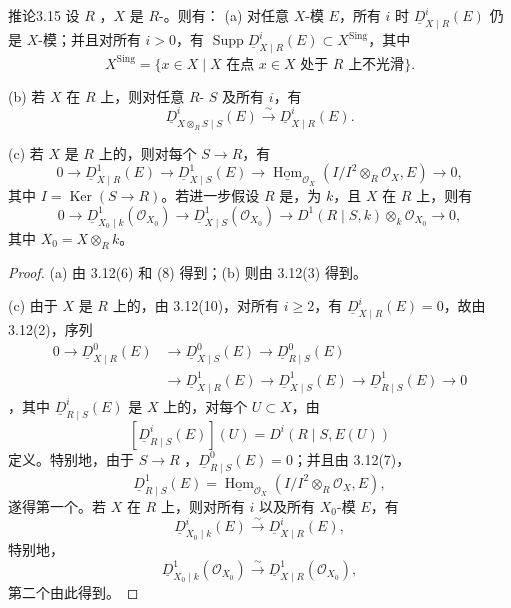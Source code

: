 \begin{SGAresult}{推论}{3.15}
设 $R$ ，$X$ 是 $R$-。则有：
(a) 对任意 $X$-模 $E$，所有 $i$ 时 $\underline D^i_{X\mid R}(E)$ 仍是 $X$-模；并且对所有 $i>0$，有 $\operatorname{Supp}\underline D^i_{X\mid R}(E)\subset X^{\mathrm{Sing}}$，其中
\[X^{\mathrm{Sing}}=\{x\in X\mid X\text{ 在点 }x\in X\text{ 处于 }R\text{ 上不光滑}\}.\]

(b) 若 $X$ 在 $R$ 上，则对任意 $R$- $S$ 及所有 $i$，有
\[\underline D^i_{X\otimes_R S\mid S}(E)\xrightarrow{\sim}\underline D^i_{X\mid R}(E).\]

(c) 若 $X$ 是 $R$ 上的，则对每个 $S\to R$，有
\[0\to\underline D^1_{X\mid R}(E)\to\underline D^1_{X\mid S}(E)\to\underline{\operatorname{Hom}}_{\mathcal O_X}(I/I^2\otimes_R\mathcal O_X,E)\to0,\]
其中 $I=\operatorname{Ker}(S\to R)$。若进一步假设 $R$ 是，为 $k$，且 $X$ 在 $R$ 上，则有
\[0\to\underline D^1_{X_0\mid k}(\mathcal O_{X_0})\to\underline D^1_{X\mid S}(\mathcal O_{X_0})\to D^1(R\mid S,k)\otimes_k\mathcal O_{X_0}\to0,\]
其中 $X_0=X\otimes_R k$。
\end{SGAresult}
\begin{proof}
(a) 由 3.12(6) 和 (8) 得到；(b) 则由 3.12(3) 得到。

(c) 由于 $X$ 是 $R$ 上的，由 3.12(10)，对所有 $i\geq2$，有 $\underline D^i_{X\mid R}(E)=0$，故由 3.12(2)，序列
\[
\begin{aligned}
0\to\underline D^0_{X\mid R}(E)&\to\underline D^0_{X\mid S}(E)\to\underline D^0_{R\mid S}(E)\\
&\to\underline D^1_{X\mid R}(E)\to\underline D^1_{X\mid S}(E)\to\underline D^1_{R\mid S}(E)\to0
\end{aligned}
\]
，其中 $\underline D^i_{R\mid S}(E)$ 是 $X$ 上的，对每个 $U\subset X$，由
\[[\underline D^i_{R\mid S}(E)](U)=D^i(R\mid S,E(U))\]
定义。特别地，由于 $S\to R$ ，$\underline D^0_{R\mid S}(E)=0$；并且由 3.12(7)，
\[\underline D^1_{R\mid S}(E)=\underline{\operatorname{Hom}}_{\mathcal O_X}(I/I^2\otimes_R\mathcal O_X,E),\]
遂得第一个。若 $X$ 在 $R$ 上，则对所有 $i$ 以及所有 $X_0$-模 $E$，有
\[\underline D^i_{X_0\mid k}(E)\xrightarrow{\sim}\underline D^i_{X\mid R}(E),\]
特别地，
\[\underline D^1_{X_0\mid k}(\mathcal O_{X_0})\xrightarrow{\sim}\underline D^1_{X\mid R}(\mathcal O_{X_0}),\]
第二个由此得到。
\end{proof}

